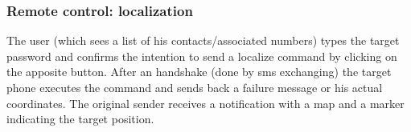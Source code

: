 \subsubsection{Remote control: localization}
The user (which sees a list of his contacts/associated numbers) types the target password and confirms the intention to send a localize command by clicking on the apposite button. After an handshake (done by sms exchanging) the target phone executes the command and sends back a failure message or his actual coordinates. The original sender receives a notification with a map and a marker indicating the target position.